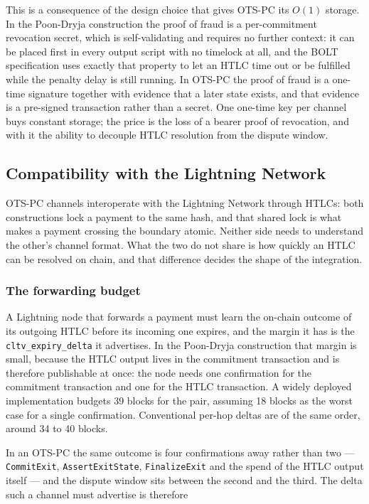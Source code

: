 \documentclass[11pt,a4paper]{article}
\newcommand{\txname}[1]{\texttt{#1}}
\begin{document}
This is a consequence of the design choice that gives OTS-PC its $O(1)$ storage. In the Poon-Dryja construction the proof of fraud is a per-commitment revocation secret, which is self-validating and requires no further context: it can be placed first in every output script with no timelock at all, and the BOLT specification uses exactly that property to let an HTLC time out or be fulfilled while the penalty delay is still running. In OTS-PC the proof of fraud is a one-time signature together with evidence that a later state exists, and that evidence is a pre-signed transaction rather than a secret. One one-time key per channel buys constant storage; the price is the loss of a bearer proof of revocation, and with it the ability to decouple HTLC resolution from the dispute window.

\subsection{Compatibility with the Lightning Network}
\label{lncompat}

OTS-PC channels interoperate with the Lightning Network through HTLCs: both constructions lock a payment to the same hash, and that shared lock is what makes a payment crossing the boundary atomic. Neither side needs to understand the other's channel format. What the two do not share is how quickly an HTLC can be resolved on chain, and that difference decides the shape of the integration.

\subsubsection{The forwarding budget}

A Lightning node that forwards a payment must learn the on-chain outcome of its outgoing HTLC before its incoming one expires, and the margin it has is the \texttt{cltv\_expiry\_delta} it advertises. In the Poon-Dryja construction that margin is small, because the HTLC output lives in the commitment transaction and is therefore publishable at once: the node needs one confirmation for the commitment transaction and one for the HTLC transaction. A widely deployed implementation budgets 39 blocks for the pair, assuming 18 blocks as the worst case for a single confirmation. Conventional per-hop deltas are of the same order, around 34 to 40 blocks.

In an OTS-PC the same outcome is four confirmations away rather than two --- \txname{CommitExit}, \txname{AssertExitState}, \txname{FinalizeExit} and the spend of the HTLC output itself --- and the dispute window sits between the second and the third. The delta such a channel must advertise is therefore
\end{document}
